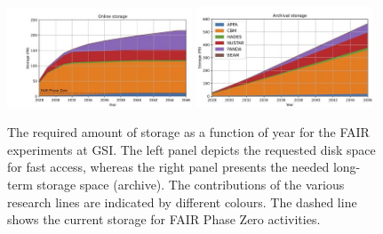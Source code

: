 \begin{figure}[htbp]
\begin{center}
\includegraphics[width=0.49\textwidth]{figures/Figure2a} 
\includegraphics[width=0.47\textwidth]{figures/Figure2b} \\ 
\caption{The required amount of storage as a function of year for the FAIR experiments at GSI. The left panel depicts the requested disk space for fast access, whereas the right panel presents the needed long-term storage space (archive). The contributions of the various research lines are indicated by different colours. The dashed line shows the current storage for FAIR Phase Zero activities.} %
\label{figures:Fig2}
\end{center}
\end{figure}

